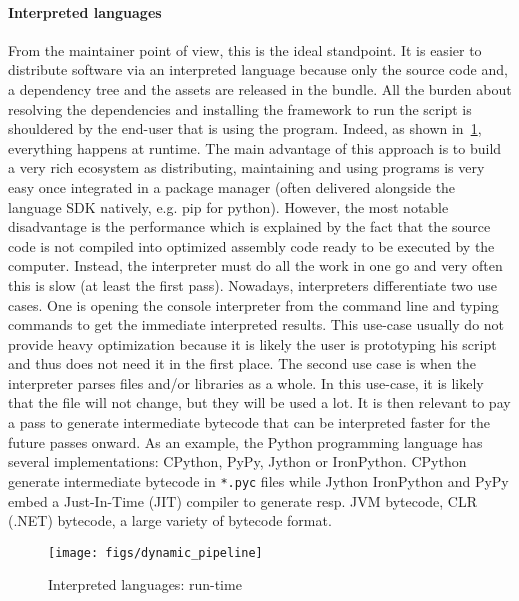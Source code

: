 \paragraph{Interpreted languages} From the maintainer point of view, this is the ideal standpoint. It is easier to
distribute software via an interpreted language because only the source code and, a dependency tree and the assets are
released in the bundle. All the burden about resolving the dependencies and installing the framework to run the script
is shouldered by the end-user that is using the program. Indeed, as shown in~\cref{fig:static.dynamic.dynamic.pipeline},
everything happens at runtime. The main advantage of this approach is to build a very rich ecosystem as distributing,
maintaining and using programs is very easy once integrated in a package manager (often delivered alongside the language
SDK natively, e.g. pip for python). However, the most notable disadvantage is the performance which is explained by the
fact that the source code is not compiled into optimized assembly code ready to be executed by the computer. Instead,
the interpreter must do all the work in one go and very often this is slow (at least the first pass). Nowadays,
interpreters differentiate two use cases. One is opening the console interpreter from the command line and typing
commands to get the immediate interpreted results. This use-case usually do not provide heavy optimization because it is
likely the user is prototyping his script and thus does not need it in the first place. The second use case is when the
interpreter parses files and/or libraries as a whole. In this use-case, it is likely that the file will not change, but
they will be used a lot. It is then relevant to pay a pass to generate intermediate bytecode that can be interpreted
faster for the future passes onward. As an example, the Python programming language has several implementations:
CPython, PyPy, Jython or IronPython. CPython generate intermediate bytecode in \texttt{*.pyc} files while Jython
IronPython and PyPy embed a Just-In-Time (JIT) compiler to generate resp. JVM bytecode, CLR (.NET) bytecode, a large
variety of bytecode format.

\begin{figure}[tbh]
  \centering
  \texttt{[image: figs/dynamic\_pipeline]}
  \caption{Interpreted languages: run-time}
  \label{fig:static.dynamic.dynamic.pipeline}
\end{figure}

